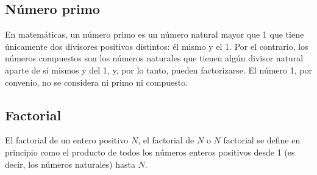 \subsection{Número primo}
En matemáticas, un número primo es un número natural mayor que 1 que tiene únicamente dos divisores 
positivos distintos: él mismo y el 1. Por el contrario, los números compuestos son los números naturales 
que tienen algún divisor natural aparte de sí mismos y del 1, y, por lo tanto, pueden factorizarse. El 
número 1, por convenio, no se considera ni primo ni compuesto. 

\subsection{Factorial}
El factorial de un entero positivo $N$, el factorial de $N$ o $N$ factorial se define en principio como el producto de todos los números enteros positivos desde 1 (es decir, los números naturales) hasta $N$.